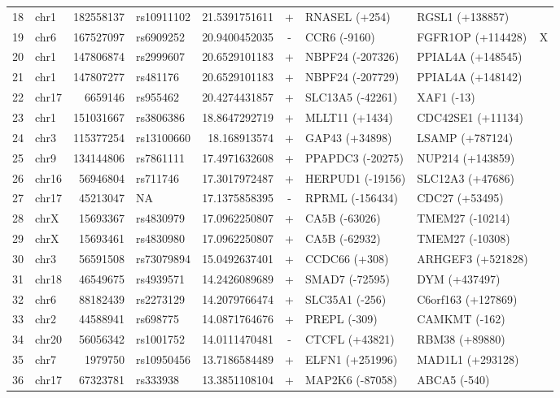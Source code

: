 \begin{table}[h!]
\begin{tabular}{rlrlrcllc}
18 & chr1 & 182558137 & rs10911102 & 21.5391751611 & + & RNASEL (+254) & RGSL1 (+138857)       & \\
19 & chr6 & 167527097 & rs6909252 & 20.9400452035 & - & CCR6 (-9160) & FGFR1OP (+114428) & X      \\
20 & chr1 & 147806874 & rs2999607 & 20.6529101183 & + & NBPF24 (-207326) & PPIAL4A (+148545)       & \\
21 & chr1 & 147807277 & rs481176 & 20.6529101183 & + & NBPF24 (-207729) & PPIAL4A (+148142)       & \\
22 & chr17 & 6659146 & rs955462 & 20.4274431857 & + & SLC13A5 (-42261) & XAF1 (-13)       & \\
23 & chr1 & 151031667 & rs3806386 & 18.8647292719 & + & MLLT11 (+1434) & CDC42SE1 (+11134)       & \\
24 & chr3 & 115377254 & rs13100660 & 18.168913574 & + & GAP43 (+34898) & LSAMP (+787124)       & \\
25 & chr9 & 134144806 & rs7861111 & 17.4971632608 & + & PPAPDC3 (-20275) & NUP214 (+143859)       & \\
26 & chr16 & 56946804 & rs711746 & 17.3017972487 & + & HERPUD1 (-19156) & SLC12A3 (+47686)       & \\
27 & chr17 & 45213047 & NA & 17.1375858395 & - & RPRML (-156434) & CDC27 (+53495)       & \\
28 & chrX & 15693367 & rs4830979 & 17.0962250807 & + & CA5B (-63026) & TMEM27 (-10214)       & \\
29 & chrX & 15693461 & rs4830980 & 17.0962250807 & + & CA5B (-62932) & TMEM27 (-10308)       & \\
30 & chr3 & 56591508 & rs73079894 & 15.0492637401 & + & CCDC66 (+308) & ARHGEF3 (+521828)       & \\
31 & chr18 & 46549675 & rs4939571 & 14.2426089689 & + & SMAD7 (-72595) & DYM (+437497)       & \\
32 & chr6 & 88182439 & rs2273129 & 14.2079766474 & + & SLC35A1 (-256) & C6orf163 (+127869)       & \\
33 & chr2 & 44588941 & rs698775 & 14.0871764676 & + & PREPL (-309) & CAMKMT (-162)       & \\
34 & chr20 & 56056342 & rs1001752 & 14.0111470481 & - & CTCFL (+43821) & RBM38 (+89880)       & \\
35 & chr7 & 1979750 & rs10950456 & 13.7186584489 & + & ELFN1 (+251996) & MAD1L1 (+293128)       & \\
36 & chr17 & 67323781 & rs333938 & 13.3851108104 & + & MAP2K6 (-87058) & ABCA5 (-540)       & \\

\end{tabular}
\end{table}
